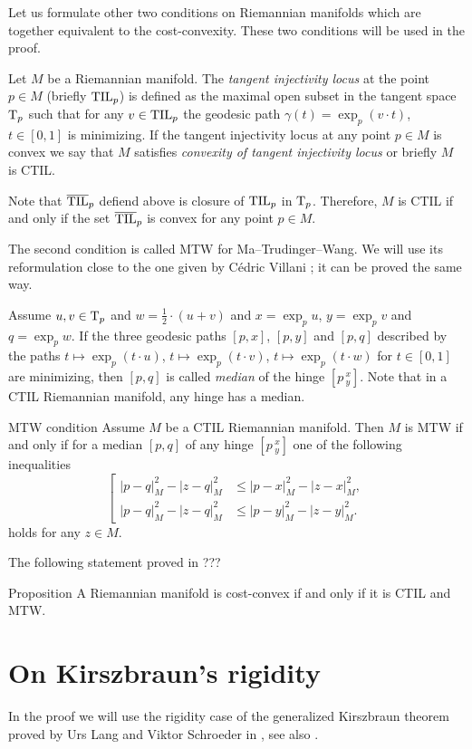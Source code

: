 Let us formulate other two conditions on Riemannian manifolds which are together equivalent to the cost-convexity.
These two conditions will be used in the proof.

Let $M$ be a Riemannian manifold.
The \emph{tangent injectivity locus} at the point $p\in M$ (briefly $\mathrm{\rm TIL}_p$) is defined as the maximal open subset in the tangent space $\mathrm{T}_p$ such that for any $v\in\mathrm{\rm TIL}_p$ the geodesic path $\gamma(t)=\exp_p(v\cdot t)$, $t\in [0,1]$ is minimizing.
If the tangent injectivity locus at any point $p\in M$ is convex we say that $M$ satisfies \emph{convexity of  tangent injectivity locus} or briefly $M$ is CTIL.

Note that $\overline{\mathrm{\rm TIL}}_p$ defiend above is closure of $\mathrm{\rm TIL}_p$ in $\mathrm{T}_p$.
Therefore, $M$ is CTIL if and only if the set $\overline{\mathrm{\rm TIL}}_p$ is convex for any point $p\in M$.

The second condition is called MTW for Ma--Trudinger--Wang.
We will use its reformulation close to the one given by Cédric Villani \cite[2.6]{MTW+CTIL}; it can be proved the same way.

Assume $u,v\in \mathrm{T}_p$ and $w=\tfrac12\cdot(u+v)$
and $x=\exp_p u$, $y=\exp_pv$ and $q=\exp_pw$.
If the three geodesic paths $[p,x]$, $[p,y]$ and $[p,q]$ described by the paths 
$t\mapsto\exp_p(t\cdot u)$,  $t\mapsto\exp_p(t\cdot v)$, $t\mapsto\exp_p(t\cdot w)$ for $t\in[0,1]$ are minimizing, then $[p,q]$ is called \emph{median} of the hinge $[p\,^x_y]$.
Note that in a CTIL Riemannian manifold, any hinge has a median.

\begin{thm}{MTW condition}\label{MTW}
Assume $M$ be a CTIL Riemannian manifold. 
Then $M$ is MTW if and only if for a median $[p,q]$ of any hinge $[p\,^x_y]$ one of the following inequalities
\[
\left[
\begin{aligned}
|p-q|^2_M-|z-q|^2_M&\le |p-x|^2_M-|z-x|^2_M,
\\
|p-q|^2_M-|z-q|^2_M&\le |p-y|^2_M-|z-y|^2_M.
\end{aligned}
\right.
\]
holds for any $z\in M$.
\end{thm}

The following statement proved in ???

\begin{thm}{Proposition}
A Riemannian manifold is cost-convex if and only if it is CTIL and MTW. 
\end{thm}


\section{On Kirszbraun's rigidity}
In the proof we will use the rigidity case of the generalized Kirszbraun theorem proved by Urs Lang and Viktor Schroeder in \cite{LS}, see also \cite{AKP}.

